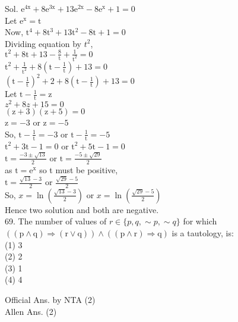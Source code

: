 \documentclass[10pt]{article}
\begin{document}
Sol. \(\mathrm{e}^{4 \mathrm{x}}+8 \mathrm{e}^{3 \mathrm{x}}+13 \mathrm{e}^{2 \mathrm{x}}-8 \mathrm{e}^{\mathrm{x}}+1=0\)\\
Let \(\mathrm{e}^{\mathrm{x}}=\mathrm{t}\)\\
Now, \(\mathrm{t}^{4}+8 \mathrm{t}^{3}+13 \mathrm{t}^{2}-8 \mathrm{t}+1=0\)\\
Dividing equation by \(t^{2}\),\\
\(\mathrm{t}^{2}+8 \mathrm{t}+13-\frac{8}{\mathrm{t}}+\frac{1}{\mathrm{t}^{2}}=0\)\\
\(\mathrm{t}^{2}+\frac{1}{\mathrm{t}^{2}}+8\left(\mathrm{t}-\frac{1}{\mathrm{t}}\right)+13=0\)\\
\(\left(\mathrm{t}-\frac{1}{\mathrm{t}}\right)^{2}+2+8\left(\mathrm{t}-\frac{1}{\mathrm{t}}\right)+13=0\)\\
Let \(\mathrm{t}-\frac{1}{\mathrm{t}}=\mathrm{z}\)\\
\(z^{2}+8 z+15=0\)\\
\((\mathrm{z}+3)(\mathrm{z}+5)=0\)\\
\(\mathrm{z}=-3\) or \(\mathrm{z}=-5\)\\
So, \(\mathrm{t}-\frac{1}{\mathrm{t}}=-3\) or \(\mathrm{t}-\frac{1}{\mathrm{t}}=-5\)\\
\(\mathrm{t}^{2}+3 \mathrm{t}-1=0\) or \(\mathrm{t}^{2}+5 \mathrm{t}-1=0\)\\
\(\mathrm{t}=\frac{-3 \pm \sqrt{13}}{2}\) or \(\mathrm{t}=\frac{-5 \pm \sqrt{29}}{2}\)\\
as \(\mathrm{t}=\mathrm{e}^{\mathrm{x}}\) so t must be positive,\\
\(\mathrm{t}=\frac{\sqrt{13}-3}{2}\) or \(\frac{\sqrt{29}-5}{2}\)\\
So, \(x=\ln \left(\frac{\sqrt{13}-3}{2}\right)\) or \(x=\ln \left(\frac{\sqrt{29}-5}{2}\right)\)\\
Hence two solution and both are negative.\\
69. The number of values of \(r \in\{p, q, \sim p, \sim q\}\) for which \(((\mathrm{p} \wedge \mathrm{q}) \Rightarrow(\mathrm{r} \vee \mathrm{q})) \wedge((\mathrm{p} \wedge \mathrm{r}) \Rightarrow \mathrm{q})\) is a tautology, is:\\
(1) 3\\
(2) 2\\
(3) 1\\
(4) 4

Official Ans. by NTA (2)\\
Allen Ans. (2)
\end{document}
